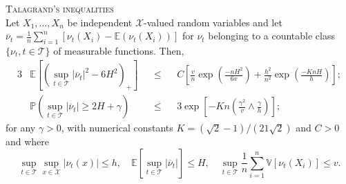 \begin{lm}{\textsc{Talagrand's inequalities}\\}\label{LM_TALAGRAND}
Let $X_{1}, \hdots , X_{n}$ be independent $\mathcal{X}$-valued random variables and let $\overline{\nu}_{t} = \frac{1}{n} \sum\limits_{i = 1}^{n} [\nu_{t}(X_{i}) - \mathds{E}(\nu_{t}(X_{i}))]$ for $\nu_{t}$ belonging to a countable class $\{\nu_{t}, t \in \mathcal{T}\}$ of measurable functions. Then,
\begin{alignat*}{3}
& \mathds{E}\left[\left(\sup\limits_{t \in \mathcal{T}}\vert \overline{\nu}_{t} \vert^{2} - 6 H^{2}\right)_{+}\right] && \leq && C \left[\frac{v}{n} \exp\left(\frac{-n H^{2}}{6 v}\right) + \frac{h^{2}}{n^{2}} \exp\left(\frac{- K n H}{h}\right)\right];\\
& \mathds{P}\left(\sup\limits_{t \in \mathcal{T}} \vert \overline{\nu}_{t} \vert \geq 2 H + \gamma\right) && \leq && 3 \exp\left[- K n \left(\frac{\gamma^{2}}{v} \wedge \frac{\gamma}{h}\right)\right];
\end{alignat*}
for any $\gamma > 0$, with numerical constants $K = (\sqrt{2} - 1) /(21\sqrt{2})$ and $C > 0$ and where 
\[\sup\limits_{t \in \mathcal{T}}\sup\limits_{x \in \mathcal{X}}\vert \nu_{t}(x)\vert \leq h, \quad \mathds{E}[\sup\limits_{t \in \mathcal{T}}  \vert \overline{\nu}_{t} \vert] \leq H, \quad \sup\limits_{t \in \mathcal{T}} \frac{1}{n} \sum\limits_{i = 1}^{n} \mathds{V}[\nu_{t}(X_{i})] \leq v.\]
\end{lm}

